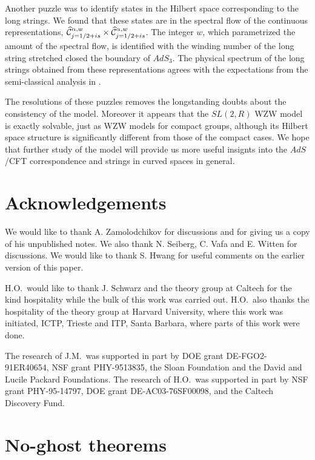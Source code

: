 Another puzzle was to identify states in the Hilbert space
corresponding to the long strings. We found that
these states are in the spectral flow of the continuous
representations, $\widehat{\cal C}_{j=1/2 + is}^{\alpha, w}
\times \widehat{\cal C}_{j=1/2 + is}^{\alpha, w}$. 
The integer $w$, which parametrized the amount of the spectral flow,
is identified with the winding number 
of the long string stretched closed the boundary of $AdS_3$. 
The physical spectrum of the long strings obtained from these 
representations agrees with the expectations from the semi-classical 
analysis in \cite{Maldacena:1998uz,Seiberg:1999xz}.

The resolutions of these puzzles removes 
the longstanding doubts about the consistency of the model. 
Moreover it appears that the $SL(2,R)$ WZW model is exactly 
solvable, just as WZW models for compact groups, although its 
Hilbert space structure is significantly different from those
of the compact cases. We hope that further study of the model 
will provide us more useful insignts into the $AdS$/CFT 
correspondence and strings in curved spaces in general.   

\section*{Acknowledgements}

We would like to thank A. Zamolodchikov for discussions 
and for giving us a copy of his unpublished notes. 
We also thank N. Seiberg, C. Vafa and  E. Witten 
for discussions. We would like to thank S. Hwang
for useful comments on the earlier version of this paper.

H.O.\ would like to thank J. Schwarz and 
the theory group at Caltech for the kind hospitality
while the bulk of this work was carried out. 
H.O.\ also thanks the hospitality of the theory group 
at Harvard University, where this work was initiated,
ICTP, Trieste and ITP, Santa Barbara, where
parts of this work were done. 

The research of J.M.\ 
was supported in part by DOE grant DE-FGO2-91ER40654,
 NSF grant PHY-9513835, the Sloan Foundation and the 
 David and Lucile Packard Foundations. 
The research of H.O.\ was supported in part by 
NSF grant PHY-95-14797, DOE grant DE-AC03-76SF00098,
and the Caltech Discovery Fund. 

\newpage

\appendix

\section{No-ghost theorems}

